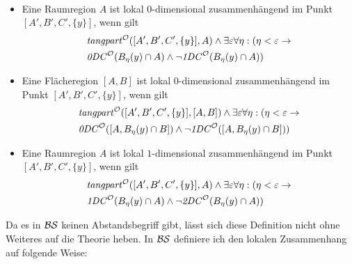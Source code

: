     \begin{dfn}\ \vspace{0pt}

        \begin{itemize}
            \item Eine Raumregion $A$ ist lokal $0$-dimensional zusammenhängend im Punkt $[A', B', C', \{y\}]$, wenn gilt
            \begin{align*}
                &\mathit{tangpart}^\mathcal{O}([A', B', C', \{y\}],A) \land \exists \varepsilon \forall \eta: (\eta < \varepsilon \to 
                \\
                &\mathit{0DC}^\mathcal{O}(B_{\eta}(y) \cap A) \land \neg \mathit{1DC}^\mathcal{O}(B_{\eta}(y) \cap A))
            \end{align*}
            \item Eine Flächeregion $[A,B]$ ist lokal $0$-dimensional zusammenhängend im Punkt $[A', B', C', \{y\}]$, wenn gilt
            \begin{align*}
                &\mathit{tangpart}^\mathcal{O}([A', B', C', \{y\}],[A,B]) \land \exists \varepsilon \forall \eta:
                (\eta < \varepsilon \to
                \\
                &\mathit{0DC}^\mathcal{O}([A,B_{\eta}(y) \cap B]) \land \neg \mathit{1DC}^\mathcal{O}([A,B_{\eta}(y) \cap B]))
            \end{align*}
            \item Eine Raumregion $A$ ist lokal $1$-dimensional zusammenhängend im Punkt $[A', B', C', \{y\}]$, wenn gilt
            \begin{align*}
                &\mathit{tangpart}^\mathcal{O}([A', B', C', \{y\}],A) \land \exists \varepsilon \forall \eta: (\eta < \varepsilon \to 
                \\
                &\mathit{1DC}^\mathcal{O}(B_{\eta}(y) \cap A) \land \neg \mathit{2DC}^\mathcal{O}(B_{\eta}(y) \cap A))
            \end{align*}
        \end{itemize}
        
    \end{dfn}
%     
    Da es in $\mathcal{BS}$ keinen Abstandsbegriff gibt, lässt sich diese Definition nicht ohne Weiteres auf die Theorie heben. 
    In $\mathcal{BS}$ definiere ich den lokalen Zusammenhang auf folgende Weise:
%
